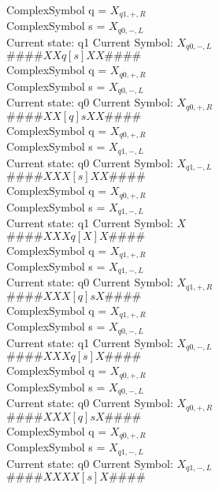 \documentclass[10pt, a4paper]{article}
\begin{document}
ComplexSymbol q = $X_{q1,+,R}$ \\
ComplexSymbol s = $X_{q0,-,L}$ \\ 
 \medskip
Current state: q1	 Current Symbol: 	 $X_{q0,-,L}$\\
$\# \#\# \# X X q [ s ] X X \# \# \# \# $ \\
ComplexSymbol q = $X_{q0,+,R}$ \\
ComplexSymbol s = $X_{q0,-,L}$ \\ 
 \medskip
Current state: q0	 Current Symbol: 	 $X_{q0,+,R}$\\
$\# \#\# \# X X [ q ] s X X \# \# \# \# $ \\
ComplexSymbol q = $X_{q0,+,R}$ \\
ComplexSymbol s = $X_{q1,-,L}$ \\ 
 \medskip
Current state: q0	 Current Symbol: 	 $X_{q1,-,L}$\\
$\# \#\# \# X X X [ s ] X X \# \# \# \# $ \\
ComplexSymbol q = $X_{q0,+,R}$ \\
ComplexSymbol s = $X_{q1,-,L}$ \\ 
 \medskip
Current state: q1	 Current Symbol: 	 $X$\\
$\# \#\# \# X X X q [ X ] X \# \# \# \# $ \\
ComplexSymbol q = $X_{q1,+,R}$ \\
ComplexSymbol s = $X_{q1,-,L}$ \\ 
 \medskip
Current state: q0	 Current Symbol: 	 $X_{q1,+,R}$\\
$\# \#\# \# X X X [ q ] s X \# \# \# \# $ \\
ComplexSymbol q = $X_{q1,+,R}$ \\
ComplexSymbol s = $X_{q0,-,L}$ \\ 
 \medskip
Current state: q1	 Current Symbol: 	 $X_{q0,-,L}$\\
$\# \#\# \# X X X q [ s ] X \# \# \# \# $ \\
ComplexSymbol q = $X_{q0,+,R}$ \\
ComplexSymbol s = $X_{q0,-,L}$ \\ 
 \medskip
Current state: q0	 Current Symbol: 	 $X_{q0,+,R}$\\
$\# \#\# \# X X X [ q ] s X \# \# \# \# $ \\
ComplexSymbol q = $X_{q0,+,R}$ \\
ComplexSymbol s = $X_{q1,-,L}$ \\ 
 \medskip
Current state: q0	 Current Symbol: 	 $X_{q1,-,L}$\\
$\# \#\# \# X X X X [ s ] X \# \# \# \# $ \\
\end{document}
